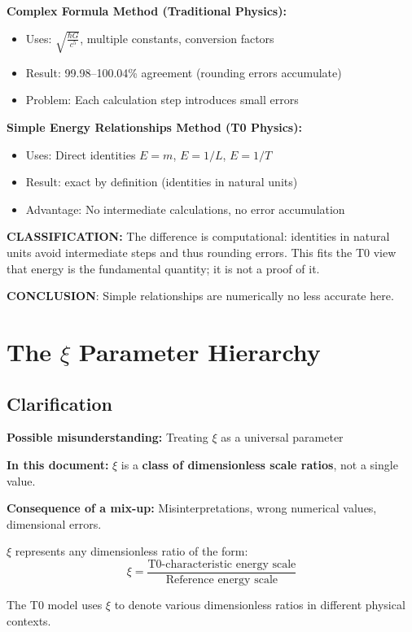 	\begin{tcolorbox}[colback=blue!5!white,colframe=blue!75!black,title=Accuracy through Simplification]
		\textbf{Complex Formula Method (Traditional Physics):}
		\begin{itemize}
			\item Uses: $\sqrt{\frac{\hbar G}{c^5}}$, multiple constants, conversion factors
			\item Result: 99.98–100.04\% agreement (rounding errors accumulate)
			\item Problem: Each calculation step introduces small errors
		\end{itemize}
		
		\textbf{Simple Energy Relationships Method (T0 Physics):}
		\begin{itemize}
			\item Uses: Direct identities $E = m$, $E = 1/L$, $E = 1/T$
			\item Result: exact by definition (identities in natural units)
			\item Advantage: No intermediate calculations, no error accumulation
		\end{itemize}
		
		\textbf{CLASSIFICATION:}
		The difference is computational: identities in natural units avoid intermediate steps and thus rounding errors. This fits the T0 view that energy is the fundamental quantity; it is not a proof of it.
		
		\textbf{CONCLUSION}: Simple relationships are numerically no less accurate here.
	\end{tcolorbox}
	
	\section{The $\xi$ Parameter Hierarchy}
	
	\subsection{Clarification}
	
	\begin{tcolorbox}[colback=red!10!white,colframe=red!75!black,title=Note: Use of the Symbol $\xi$ in This Document]
		\textbf{Possible misunderstanding:} Treating $\xi$ as a universal parameter
		
		\textbf{In this document:} $\xi$ is a \textbf{class of dimensionless scale ratios}, not a single value.
		
		\textbf{Consequence of a mix-up:} Misinterpretations, wrong numerical values, dimensional errors.
		
		$\xi$ represents any dimensionless ratio of the form:
		\begin{equation}
			\xi = \frac{\text{T0-characteristic energy scale}}{\text{Reference energy scale}}
		\end{equation}
		
		The T0 model uses $\xi$ to denote various dimensionless ratios in different physical contexts.
	\end{tcolorbox}
	
